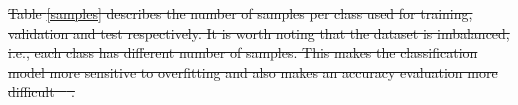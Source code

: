 \documentclass[journal,article,submit,pdftex,moreauthors]{Definitions/mdpi}
\providecommand{\DIFdel}[1]{{\protect\color{red}\sout{#1}}}                      %
\providecommand{\DIFdelbegin}{} %
\providecommand{\DIFdelend}{} %
\begin{document}
\DIFdelbegin \DIFdel{Table \ref{samples} describes the number of samples per class used for training, validation and test respectively.
It is worth noting that the dataset is imbalanced, i.e., each class has different number of samples. This makes the classification model more sensitive to overfitting and also makes an accuracy evaluation more difficult \mbox{%
\cite{Foody2002}}\hskip0pt%
.
}\DIFdelend %
\end{document}

